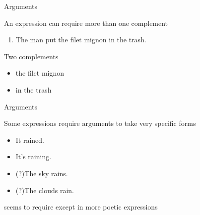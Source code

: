 \documentclass{beamer}
\newcommand{\subonefour}{Arguments}
\begin{document}
      \begin{frame}{\subonefour}
        \begin{block}{}
          An expression can require more than one complement
        \end{block}
        \begin{example}
          \begin{enumerate}
            \item The man put the filet mignon in the trash.
          \end{enumerate}
        \end{example}
        \begin{block}{Two complements}
          \begin{itemize}
            \item the filet mignon
            \item in the trash
          \end{itemize}
        \end{block}
      \end{frame}

      \begin{frame}{\subonefour}
        \begin{block}{}
          Some expressions require arguments to take very specific forms
        \end{block}
        \begin{example}
          \begin{itemize}
            \item It rained.
            \item It's raining.
            \item (?)The sky rains.
            \item (?)The clouds rain.
          \end{itemize}
        \end{example}
        \begin{block}{}
           seems to require  except in more poetic expressions
        \end{block}
      \end{frame}
\end{document}
